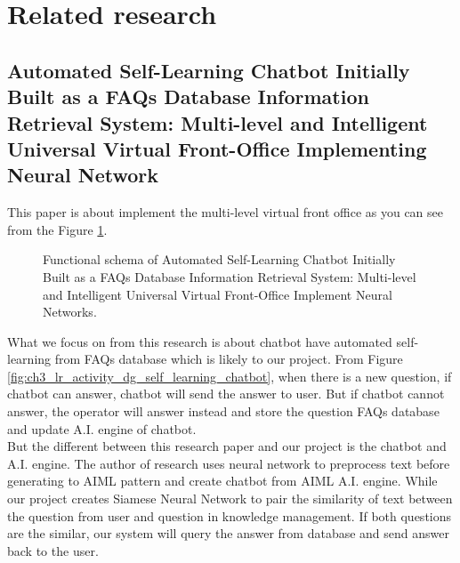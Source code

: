 \documentclass[12pt,oneside,openright,a4paper]{cpe-english-project}
\begin{document}
\section{Related research}
\subsection{Automated Self-Learning Chatbot Initially Built as a FAQs Database Information Retrieval
System: Multi-level and Intelligent Universal Virtual Front-Office Implementing Neural Network}
This paper is about implement the multi-level virtual front office as you can see from the Figure
\ref*{fig:ch3_lr_self_learning_chatbot}. 
\begin{figure}[h!]
  \centering
  \setlength{\fboxrule}{0.2mm}
  \setlength{\fboxsep}{0.5cm}
  \caption{Functional schema of Automated Self-Learning Chatbot Initially Built as a FAQs
  Database Information Retrieval System: Multi-level and Intelligent Universal Virtual
  Front-Office Implement Neural Networks.}
  \label{fig:ch3_lr_self_learning_chatbot}
\end{figure}

What we focus on from this research is about chatbot have automated self-learning from FAQs
database which is likely to our project. From Figure \ref*{fig:ch3_lr_activity_dg_self_learning_chatbot},
when there is a new question, if chatbot can answer, chatbot will send the answer to user.
But if chatbot cannot answer, the operator will answer instead and store the question FAQs
database and update A.I. engine of chatbot.\\
But the different between this research paper and our project is the chatbot and A.I. engine.
The author of research uses neural network to preprocess text before generating to AIML
pattern and create chatbot from AIML A.I. engine. While our project creates Siamese Neural
Network to pair the similarity of text between the question from user and question in
knowledge management. If both questions are the similar, our system will query the answer
from database and send answer back to the user.
\end{document}
